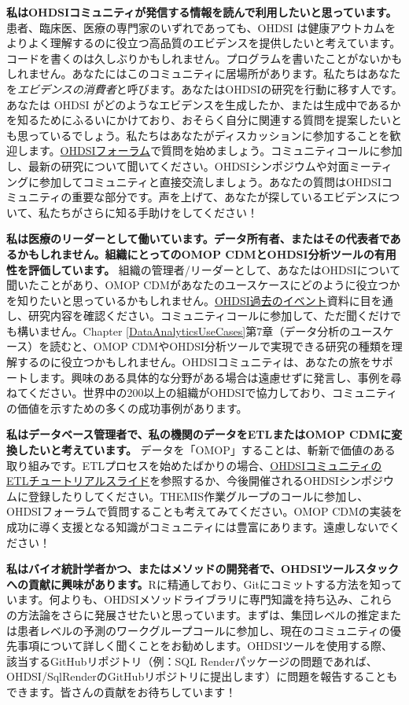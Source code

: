 \documentclass[
  11pt]{book}
\theoremstyle{definition}
\theoremstyle{definition}
\theoremstyle{definition}
\theoremstyle{definition}
\theoremstyle{remark}
\begin{document}
\textbf{私はOHDSIコミュニティが発信する情報を読んで利用したいと思っています。} 患者、臨床医、医療の専門家のいずれであっても、OHDSI は健康アウトカムをよりよく理解するのに役立つ高品質のエビデンスを提供したいと考えています。コードを書くのは久しぶりかもしれません。プログラムを書いたことがないかもしれません。あなたにはこのコミュニティに居場所があります。私たちはあなたを\emph{エビデンスの消費者}と呼びます。あなたはOHDSIの研究を行動に移す人です。あなたは OHDSI がどのようなエビデンスを生成したか、または生成中であるかを知るためにふるいにかけており、おそらく自分に関連する質問を提案したいとも思っているでしょう。私たちはあなたがディスカッションに参加することを歓迎します。\href{http://forums.ohdsi.org}{OHDSIフォーラム}で質問を始めましょう。コミュニティコールに参加し、最新の研究について聞いてください。OHDSIシンポジウムや対面ミーティングに参加してコミュニティと直接交流しましょう。あなたの質問はOHDSIコミュニティの重要な部分です。声を上げて、あなたが探しているエビデンスについて、私たちがさらに知る手助けをしてください！

\textbf{私は医療のリーダーとして働いています。データ所有者、またはその代表者であるかもしれません。組織にとってのOMOP CDMとOHDSI分析ツールの有用性を評価しています。} 組織の管理者/リーダーとして、あなたはOHDSIについて聞いたことがあり、OMOP CDMがあなたのユースケースにどのように役立つかを知りたいと思っているかもしれません。\href{https://www.ohdsi.org/past-events/}{OHDSI過去のイベント}資料に目を通し、研究内容を確認ください。コミュニティコールに参加して、ただ聞くだけでも構いません。Chapter \ref{DataAnalyticsUseCases}第7章（データ分析のユースケース）を読むと、OMOP CDMやOHDSI分析ツールで実現できる研究の種類を理解するのに役立つかもしれません。OHDSIコミュニティは、あなたの旅をサポートします。興味のある具体的な分野がある場合は遠慮せずに発言し、事例を尋ねてください。世界中の200以上の組織がOHDSIで協力しており、コミュニティの価値を示すための多くの成功事例があります。

\textbf{私はデータベース管理者で、私の機関のデータをETLまたはOMOP CDMに変換したいと考えています。} データを「OMOP」することは、斬新で価値のある取り組みです。ETLプロセスを始めたばかりの場合、\href{https://www.ohdsi-europe.org/images/symposium-2019/tutorials/OHDSI_Vocabulary_CDM_Tutorial.pdf}{OHDSIコミュニティのETLチュートリアルスライド}を参照するか、今後開催されるOHDSIシンポジウムに登録したりしてください。THEMIS作業グループのコールに参加し、OHDSIフォーラムで質問することも考えてみてください。OMOP CDMの実装を成功に導く支援となる知識がコミュニティには豊富にあります。遠慮しないでください！

\textbf{私はバイオ統計学者かつ、またはメソッドの開発者で、OHDSIツールスタックへの貢献に興味があります。}Rに精通しており、Gitにコミットする方法を知っています。何よりも、OHDSIメソッドライブラリに専門知識を持ち込み、これらの方法論をさらに発展させたいと思っています。まずは、集団レベルの推定または患者レベルの予測のワークグループコールに参加し、現在のコミュニティの優先事項について詳しく聞くことをお勧めします。OHDSIツールを使用する際、該当するGitHubリポジトリ（例：SQL Renderパッケージの問題であれば、OHDSI/SqlRenderのGitHubリポジトリに提出します）に問題を報告することもできます。皆さんの貢献をお待ちしています！
\end{document}
